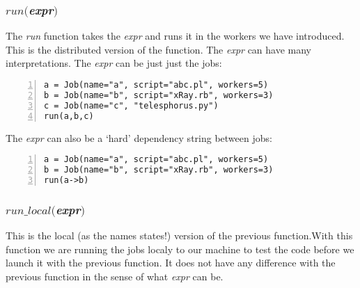 \subsubsection*{$run($\textit{expr}$)$}
The \textit{run} function takes the \textit{expr} and runs it in the workers we have introduced.
This is the distributed version of the function.
The \textit{expr} can have many interpretations. The \textit{expr} can be just just the jobs:
\begin{Verbatim}[numbers=left]
a = Job(name="a", script="abc.pl", workers=5)
b = Job(name="b", script="xRay.rb", workers=3)
c = Job(name="c", "telesphorus.py")
run(a,b,c)
\end{Verbatim}
The \textit{expr} can also be a `hard' dependency string between jobs:
\begin{Verbatim}[numbers=left]
a = Job(name="a", script="abc.pl", workers=5)
b = Job(name="b", script="xRay.rb", workers=3)
run(a->b)
\end{Verbatim}
\subsubsection*{$run\_local($\textit{expr}$)$}
This is the local (as the names states!) version of the previous function.With this function we are running the jobs localy to our machine to test the code before we launch it with the previous function. It does not have any difference with the previous function in the sense of what \textit{expr} can be.
